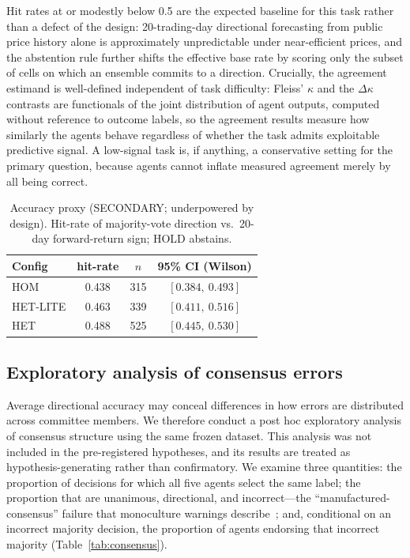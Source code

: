 \documentclass{ieeeaccess}
\begin{document}
Hit rates at or modestly below 0.5 are the expected baseline for this task
rather than a defect of the design: 20-trading-day directional forecasting from
public price history alone is approximately unpredictable under near-efficient
prices, and the abstention rule further shifts the effective base rate by
scoring only the subset of cells on which an ensemble commits to a direction.
Crucially, the agreement estimand is well-defined independent of task
difficulty: Fleiss' $\kappa$ and the $\Delta\kappa$ contrasts are functionals of
the joint distribution of agent outputs, computed without reference to outcome
labels, so the agreement results measure how similarly the agents behave
regardless of whether the task admits exploitable predictive signal. A
low-signal task is, if anything, a conservative setting for the primary
question, because agents cannot inflate measured agreement merely by all being
correct.

\begin{table}[!t]
\centering
\caption{Accuracy proxy (SECONDARY; underpowered by design). Hit-rate of
majority-vote direction vs.\ 20-day forward-return sign; HOLD abstains.}
\label{tab:acc}
\begin{tabular}{lccc}
\toprule
Config & hit-rate & $n$ & 95\% CI (Wilson) \\
\midrule
HOM & 0.438 & 315 & $[0.384,\ 0.493]$ \\
HET-LITE & 0.463 & 339 & $[0.411,\ 0.516]$ \\
HET & 0.488 & 525 & $[0.445,\ 0.530]$ \\
\bottomrule
\end{tabular}
\end{table}

\subsection{Exploratory analysis of consensus errors}
\label{sec:consensus}
Average directional accuracy may conceal differences in how errors are
distributed across committee members. We therefore conduct a post hoc
exploratory analysis of consensus structure using the same frozen dataset. This
analysis was not included in the pre-registered hypotheses, and its results are
treated as hypothesis-generating rather than confirmatory. We examine three
quantities: the proportion of decisions for which all five agents select the
same label; the proportion that are unanimous, directional, and incorrect---the
``manufactured-consensus'' failure that monoculture warnings
describe~\cite{kim2025correlated}; and, conditional on an incorrect majority
decision, the proportion of agents endorsing that incorrect majority
(Table~\ref{tab:consensus}).
\end{document}
